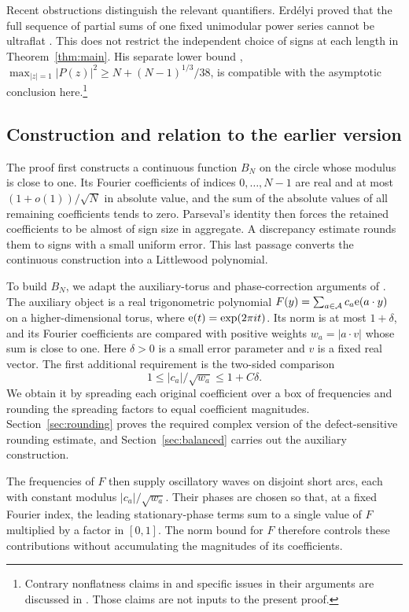 Recent obstructions distinguish the relevant quantifiers. Erd\'elyi
proved that the full sequence of partial sums of one fixed unimodular
power series cannot be ultraflat
\cite[Theorem~2.1]{ErdelyiSections2026}. This does not restrict the
independent choice of signs at each length in Theorem~\ref{thm:main}.
His separate lower bound
\cite[Theorem~2.1]{Erdelyi2026},
$\max_{|z|=1}|P(z)|^2\ge N+(N-1)^{1/3}/38$, is compatible with
the asymptotic conclusion here.\footnote{Contrary nonflatness claims
in \cite{ElAbdalaoui2025,ElAbdalaoui2025Generalization} and specific
issues in their arguments are discussed in
\cite[Appendix~A]{OpenAIMinimal}. Those claims are not inputs to the
present proof.}

\subsection{Construction and relation to the earlier version}

The proof first constructs a continuous function $B_N$ on the circle
whose modulus is close to one. Its Fourier coefficients of indices
$0,\ldots,N-1$ are real and at most $(1+o(1))/\sqrt N$ in absolute
value, and the sum of the absolute values of all remaining coefficients
tends to zero. Parseval's identity then forces the retained coefficients
to be almost of sign size in aggregate. A discrepancy estimate rounds
them to signs with a small uniform error. This last passage converts
the continuous construction into a Littlewood polynomial.

To build $B_N$, we adapt the auxiliary-torus and phase-correction
arguments of \cite[Sections~2, 4, and~5]{OpenAILowerEnvelope2026}.
The auxiliary object is a real trigonometric polynomial
$F(y)=\sum_{a\in\mathcal A}c_a\mathrm e(a\cdot y)$ on a higher-dimensional
torus, where $\mathrm e(t)=\exp(2\pi i t)$. Its norm is at most $1+\delta$,
and its Fourier coefficients
are compared with positive weights $w_a=|a\cdot v|$ whose sum is
close to one. Here $\delta>0$ is a small error parameter and $v$ is
a fixed real vector. The first additional requirement is the two-sided
comparison
\[
 1\le |c_a|/\sqrt{w_a}\le1+C\delta.
\]
We obtain it by spreading each original coefficient over a box of
frequencies and rounding the spreading factors to equal coefficient
magnitudes. Section~\ref{sec:rounding} proves the required complex
version of the defect-sensitive rounding estimate, and
Section~\ref{sec:balanced} carries out the auxiliary construction.

The frequencies of $F$ then supply oscillatory waves on disjoint short
arcs, each with constant modulus $|c_a|/\sqrt{w_a}$. Their phases are
chosen so that, at a fixed Fourier index, the leading stationary-phase
terms sum to a single value of $F$ multiplied by a factor in $[0,1]$.
The norm bound for $F$ therefore controls these contributions without accumulating
the magnitudes of its coefficients.

